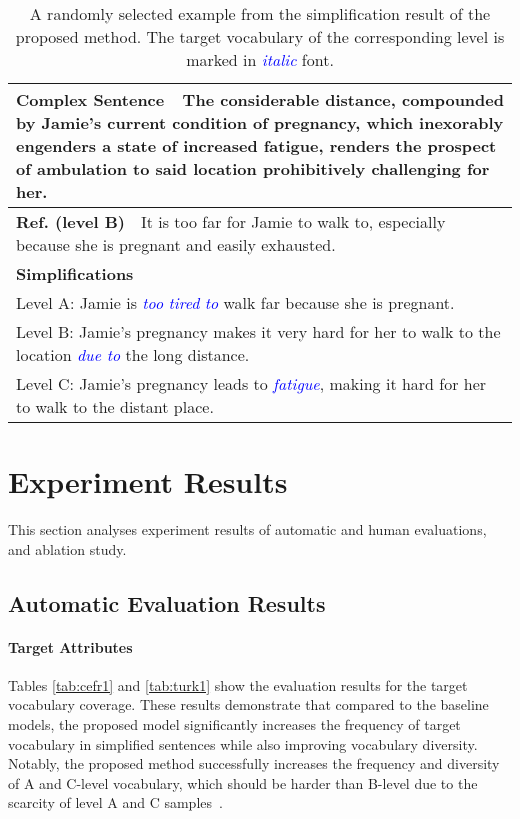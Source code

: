 \begin{table*}[t!]
    \centering
    \begin{tabular}{p{}}\hline
    \textbf{Complex Sentence}~~The considerable distance, compounded by Jamie's current condition of pregnancy, which inexorably engenders a state of increased fatigue, renders the prospect of ambulation to said location prohibitively challenging for her.\\\hline
\textbf{Ref. (level B)}~~It is too far for Jamie to walk to, especially because she is pregnant and easily exhausted.\\\hline
\textbf{Simplifications}  \\
Level A: Jamie is \textcolor{blue}{\textit{too}} \textcolor{blue}{\textit{tired}} \textcolor{blue}{\textit{to}} walk far because she is pregnant.\\

Level B: Jamie's pregnancy makes it very hard for her to walk to the location \textcolor{blue}{\textit{due to}} the long distance.\\

Level C: Jamie's pregnancy leads to \textcolor{blue}{\textit{fatigue}}, making it hard for her to walk to the distant place.\\\hline
    \end{tabular}
    \caption{A randomly selected example from the simplification result of the proposed method. The target vocabulary of the corresponding level is marked in \textcolor{blue}{\textit{italic}} font.}
     \label{tab:result demo}
\end{table*}


\section{Experiment Results}
This section analyses experiment results of automatic and human evaluations, and ablation study.  
\subsection{Automatic Evaluation Results}



\paragraph{Target Attributes }
Tables \ref{tab:cefr1} and \ref{tab:turk1} show the evaluation results for the target vocabulary coverage. 
These results demonstrate that 
compared to the baseline models, the proposed model significantly increases the frequency of target vocabulary in simplified sentences while also improving vocabulary diversity. 
Notably, the proposed method successfully increases the frequency and diversity of A and C-level vocabulary, which should be harder than B-level due to the scarcity of level A and C samples~\cite{arase-etal-2022-cefr}. 

